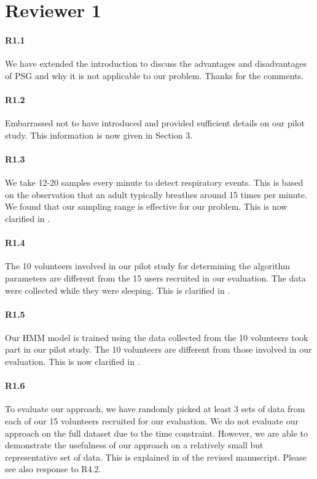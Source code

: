 \section*{Reviewer 1}

\paragraph{R1.1} We have extended the introduction to discuss the advantages and disadvantages of PSG and why it is not applicable to our
problem. Thanks for the comments.

\paragraph{R1.2} Embarrassed not to have introduced and provided sufficient details on our pilot study. This information is now given in Section 3.

\paragraph{R1.3} We take 12-20 samples every minute to detect respiratory events. This is based on the observation that an adult typically
breathes around 15 times per minute. We found that our sampling range is effective for our problem. This is now clarified in .

\paragraph{R1.4} The 10 volunteers involved in our pilot study for determining the algorithm parameters are different from the 15 users recruited in our
evaluation. The data were collected while they were sleeping. This is clarified in .

\paragraph{R1.5} Our HMM model is trained using the data collected from the 10 volunteers took part in our pilot study. The 10 volunteers
are different from those involved in our evaluation. This is now clarified in .

\paragraph{R1.6} To evaluate our approach, we have randomly picked at least 3 sets of data from each of our 15 volunteers recruited for our
evaluation. We do not evaluate our approach on the full dataset due to the time constraint. However, we are able to demonstrate the
usefulness of our approach on a relatively small but representative set of data. This is explained in  of the revised
manuscript. Please see also response to R4.2. 

